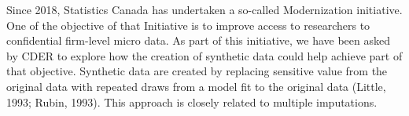 \documentclass{article}
\begin{document}
Since 2018, Statistics Canada has undertaken a so-called Modernization initiative. One of the objective of that Initiative is to improve access to researchers to confidential firm-level micro data. As part of this initiative, we have been asked by CDER to explore how the creation of synthetic data could help achieve part of that objective. Synthetic data are created by replacing sensitive value from the original data with repeated draws from a model fit to the original data (Little, 1993; Rubin, 1993). This approach is closely related to multiple imputations. 


\end{document}
